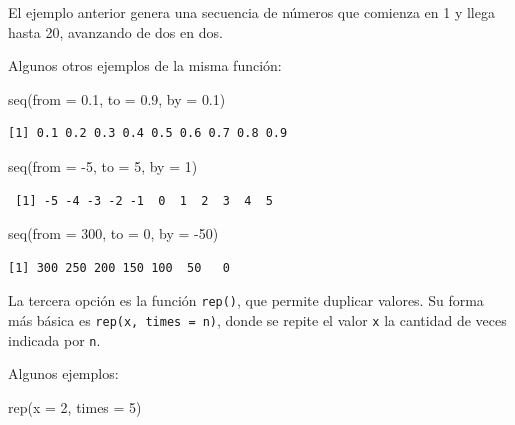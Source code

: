 \documentclass[
  spanish,
  a4paper,
]{scrbook}
\newenvironment{Shaded}{\begin{snugshade}}{\end{snugshade}}
\newcommand{\AttributeTok}[1]{\textcolor[rgb]{0.40,0.45,0.13}{#1}}
\newcommand{\DecValTok}[1]{\textcolor[rgb]{0.68,0.00,0.00}{#1}}
\newcommand{\FloatTok}[1]{\textcolor[rgb]{0.68,0.00,0.00}{#1}}
\newcommand{\FunctionTok}[1]{\textcolor[rgb]{0.28,0.35,0.67}{#1}}
\newcommand{\NormalTok}[1]{\textcolor[rgb]{0.00,0.23,0.31}{#1}}
\newcommand{\SpecialCharTok}[1]{\textcolor[rgb]{0.37,0.37,0.37}{#1}}
\begin{document}
El ejemplo anterior genera una secuencia de números que comienza en 1 y
llega hasta 20, avanzando de dos en dos.

Algunos otros ejemplos de la misma función:

\begin{Shaded}
\begin{Highlighting}[]
\FunctionTok{seq}\NormalTok{(}\AttributeTok{from =} \FloatTok{0.1}\NormalTok{, }\AttributeTok{to =} \FloatTok{0.9}\NormalTok{, }\AttributeTok{by =} \FloatTok{0.1}\NormalTok{)}
\end{Highlighting}
\end{Shaded}

\begin{verbatim}
[1] 0.1 0.2 0.3 0.4 0.5 0.6 0.7 0.8 0.9
\end{verbatim}

\begin{Shaded}
\begin{Highlighting}[]
\FunctionTok{seq}\NormalTok{(}\AttributeTok{from =} \SpecialCharTok{{-}}\DecValTok{5}\NormalTok{, }\AttributeTok{to =} \DecValTok{5}\NormalTok{, }\AttributeTok{by =} \DecValTok{1}\NormalTok{)}
\end{Highlighting}
\end{Shaded}

\begin{verbatim}
 [1] -5 -4 -3 -2 -1  0  1  2  3  4  5
\end{verbatim}

\begin{Shaded}
\begin{Highlighting}[]
\FunctionTok{seq}\NormalTok{(}\AttributeTok{from =} \DecValTok{300}\NormalTok{, }\AttributeTok{to =} \DecValTok{0}\NormalTok{, }\AttributeTok{by =} \SpecialCharTok{{-}}\DecValTok{50}\NormalTok{)}
\end{Highlighting}
\end{Shaded}

\begin{verbatim}
[1] 300 250 200 150 100  50   0
\end{verbatim}

La tercera opción es la función \texttt{rep()}, que permite duplicar
valores. Su forma más básica es \texttt{rep(x,\ times\ =\ n)}, donde se
repite el valor \texttt{x} la cantidad de veces indicada por \texttt{n}.

Algunos ejemplos:

\begin{Shaded}
\begin{Highlighting}[]
\FunctionTok{rep}\NormalTok{(}\AttributeTok{x =} \DecValTok{2}\NormalTok{, }\AttributeTok{times =} \DecValTok{5}\NormalTok{)}
\end{Highlighting}
\end{Shaded}
\end{document}
